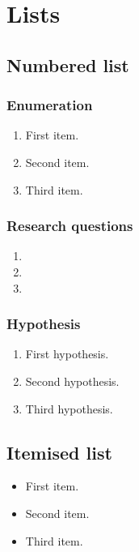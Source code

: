 \section{Lists}

\subsection{Numbered list}

\subsubsection{Enumeration}

\begin{enumerate}
    \item First item.
    \item Second item.
    \item Third item.
\end{enumerate}

\subsubsection{Research questions}

\begin{enumerate}[font={\bfseries},label={RQ\arabic*}.,align=left]
    \item \rqone
    \item \rqtwo
    \item \rqthree
\end{enumerate}

\subsubsection{Hypothesis}

\begin{enumerate}[font={\bfseries},label={H\arabic*}.,align=left]
    \item First hypothesis.
    \item Second hypothesis.
    \item Third hypothesis.
\end{enumerate}

\subsection{Itemised list}

\begin{itemize}
    \item First item.
    \item Second item.
    \item Third item.
\end{itemize}

